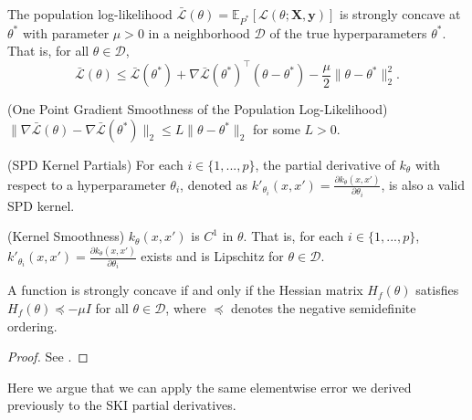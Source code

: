 \begin{assumption}\label{assumption:strong-concavity}
The population log-likelihood $\bar{\mathcal{L}}(\theta) = \mathbb{E}_{P^*}[\mathcal{L}(\theta; \mathbf{X}, \mathbf{y})]$ is strongly concave at $\theta^*$ with parameter $\mu > 0$ in a neighborhood $\mathcal{D}$ of the true hyperparameters $\theta^*$. That is, for all $\theta\in \mathcal{D}$,
$$
\bar{\mathcal{L}}(\theta) \leq \bar{\mathcal{L}}(\theta^*) + \nabla \bar{\mathcal{L}}(\theta^*)^\top (\theta - \theta^*) - \frac{\mu}{2} \| \theta - \theta^* \|_2^2.
$$
\end{assumption}
\begin{assumption}
    (One Point Gradient Smoothness of the Population Log-Likelihood) $\| \nabla \bar{\mathcal{L}}(\theta) - \nabla \bar{\mathcal{L}}(\theta^*) \|_2 \leq L \| \theta - \theta^* \|_2$ for some $L>0$.
\end{assumption}
\begin{assumption}
    (SPD Kernel Partials) For each $i \in \{1, ..., p\}$, the partial derivative of $k_{\theta}$ with respect to a hyperparameter $\theta_i$, denoted as $k'_{\theta_i}(x, x') = \frac{\partial k_{\theta}(x, x')}{\partial \theta_i}$, is also a valid SPD kernel.
\end{assumption}
\begin{assumption}
    (Kernel Smoothness) $k_\theta(x,x')$ is $C^1$ in $\theta$. That is, for each $i \in \{1, ..., p\}$, $k'_{\theta_i}(x, x') = \frac{\partial k_{\theta}(x, x')}{\partial \theta_i}$ exists and is Lipschitz for $\theta\in \mathcal{D}$.
\end{assumption}


\begin{proposition}\label{prop:strong_concavity_hessian}
    A function is strongly concave if and only if the Hessian matrix $H_f(\theta)$ satisfies $H_f(\theta) \preceq -\mu I$ for all $\theta \in \mathcal{D}$, where $\preceq$ denotes the negative semidefinite ordering.
\end{proposition}
\begin{proof}
    See \cite{boyd2004convex}.
\end{proof}

Here we argue that we can apply the same elementwise error we derived previously to the SKI partial derivatives.

